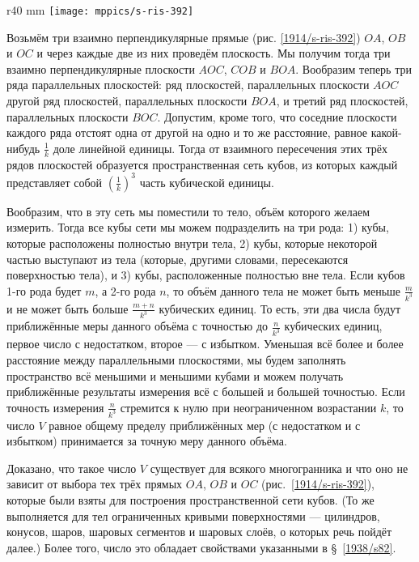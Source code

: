 \begin{wrapfigure}{r}{40 mm}
\vskip-0mm
\centering
\texttt{[image: mppics/s-ris-392]}
\caption{}\label{1914/s-ris-392}
\vskip-0mm
\end{wrapfigure}

Возьмём три взаимно перпендикулярные прямые (рис. \ref{1914/s-ris-392}) $OA$, $OB$ и $OC$ и через каждые две из них проведём плоскость.
Мы получим тогда три взаимно перпендикулярные плоскости $AOC$, $COB$ и $BOA$.
Вообразим теперь три ряда параллельных плоскостей: ряд плоскостей, параллельных плоскости $AOC$ другой ряд плоскостей, параллельных плоскости $BOA$, и третий ряд плоскостей, параллельных плоскости $BOC$.
Допустим, кроме того, что соседние плоскости каждого ряда отстоят одна от другой на одно и то же расстояние, равное какой-нибудь $\tfrac1k$ доле линейной единицы.
Тогда от взаимного пересечения этих трёх рядов плоскостей образуется пространственная сеть кубов, из которых каждый представляет собой $(\tfrac1k)^3$ часть кубической единицы.

Вообразим, что в эту сеть мы поместили то тело, объём которого желаем измерить.
Тогда все кубы сети мы можем подразделить на три рода:
1) кубы, которые расположены полностью внутри тела, 
2) кубы, которые некоторой частью выступают из тела (которые, другими словами, пересекаются поверхностью тела), и  
3) кубы, расположенные полностью вне тела.
Если кубов 1-го рода будет $m$, а 2-го рода $n$, то объём данного тела не может быть меньше $\tfrac{m}{k^3}$ и не может быть больше $\tfrac{m+n}{k^3}$ кубических единиц.
То есть, эти два числа будут приближённые меры данного объёма с точностью до $\tfrac{n}{k^3}$ кубических единиц, первое число с недостатком, второе — с избытком.
Уменьшая всё более и более расстояние между параллельными плоскостями, мы будем заполнять пространство всё меньшими и меньшими кубами и можем получать приближённые результаты измерения всё с большей и большей точностью.
Если точность измерения $\tfrac{n}{k^3}$ стремится к нулю при неограниченном возрастании $k$,
то число $V$ равное общему пределу приближённых мер (с недостатком и с избытком) принимается за точную меру данного объёма. 

Доказано, что такое число $V$ существует для всякого многогранника и что оно не зависит от выбора тех трёх прямых $OA$, $OB$ и $OC$ (рис.~\ref{1914/s-ris-392}), которые были взяты для построения пространственной сети кубов.
(То же выполняется для тел ограниченных кривыми поверхностями --- цилиндров, конусов, шаров, шаровых сегментов и шаровых слоёв, о которых речь пойдёт далее.)
Более того, число это обладает свойствами указанными в §~\ref{1938/s82}.

